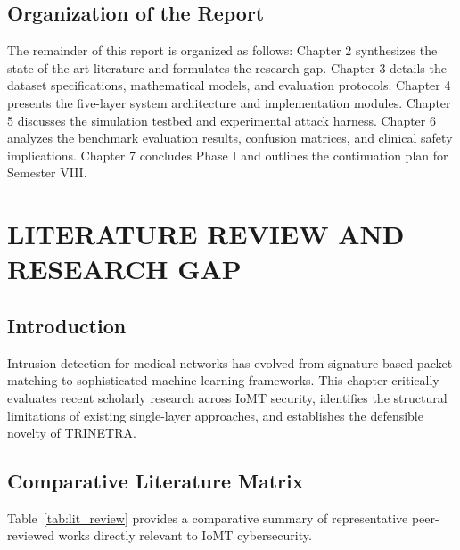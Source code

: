 \documentclass[12pt,a4paper]{report}
\begin{document}
\section{Organization of the Report}
The remainder of this report is organized as follows: Chapter 2 synthesizes the state-of-the-art literature and formulates the research gap. Chapter 3 details the dataset specifications, mathematical models, and evaluation protocols. Chapter 4 presents the five-layer system architecture and implementation modules. Chapter 5 discusses the simulation testbed and experimental attack harness. Chapter 6 analyzes the benchmark evaluation results, confusion matrices, and clinical safety implications. Chapter 7 concludes Phase I and outlines the continuation plan for Semester VIII.

\chapter{LITERATURE REVIEW AND RESEARCH GAP}

\section{Introduction}
Intrusion detection for medical networks has evolved from signature-based packet matching to sophisticated machine learning frameworks. This chapter critically evaluates recent scholarly research across IoMT security, identifies the structural limitations of existing single-layer approaches, and establishes the defensible novelty of TRINETRA.

\section{Comparative Literature Matrix}
Table~\ref{tab:lit_review} provides a comparative summary of representative peer-reviewed works directly relevant to IoMT cybersecurity.
\end{document}
